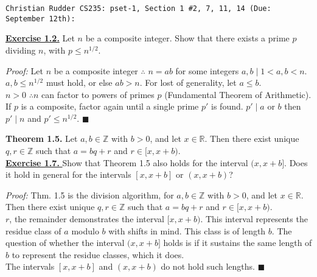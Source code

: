 \documentclass{article}
\begin{document}
\noindent
\textcolor{black!50}{\texttt{Christian Rudder CS235: pset-1, Section 1 \#2, 7, 11, 14 (Due: September 12th):}}

\vspace{2em}
\noindent
\underline{\textbf{Exercise 1.2.}} Let \( n \) be a composite integer.
Show that there exists a prime \( p \) dividing \( n \), with \( p \leq n^{1/2} \).

\begin{greenbox}
    \textit{Proof:} Let $n$ be a composite integer $\therefore$ $n = ab$ for some integers $a, b\mid 1 < a, b < n$.\\
    $a,b \leq n^{1/2}$ must hold, or else $ab > n$. For lost of generality, let $a \leq b$.\\

    \noindent
    $n>0$ $\therefore n$ can factor to powers of primes $p$ (Fundamental Theorem of Arithmetic).
    If $p$ is a composite, factor again until a single prime $p'$ is found. $p'\mid a$ or $b$ then $p' \mid n$ and $p' \leq n^{1/2}$. \hfill \(\blacksquare\)
\end{greenbox}

\noindent
\textbf{Theorem 1.5.} Let \( a, b \in \mathbb{Z} \) with \( b > 0 \), and let \( x \in \mathbb{R} \). Then there exist unique \( q, r \in \mathbb{Z} \) such that \( a = bq + r \) and \( r \in [x, x + b) \).\\

    \noindent
    \underline{\textbf{Exercise 1.7.} }Show that Theorem 1.5 also holds for the interval \( (x, x + b] \). Does it hold in general for the intervals \([x, x + b]\) or \( (x, x + b) \)?
\begin{greenbox}
    \textit{Proof:} Thm. 1.5 is the division algorithm, for \( a, b \in \mathbb{Z} \) with \( b > 0 \), and let \( x \in \mathbb{R} \). Then there exist unique \( q, r \in \mathbb{Z} \) such that \( a = bq + r \) and \( r \in [x, x + b) \).\\

    \noindent
    $r$, the remainder demonstrates the interval \([x, x + b)\).
            This interval represents the residue class of $a$ modulo $b$ with shifts in mind. This class is of length $b$.
            The question of whether the interval \((x, x + b]\) holds is if it sustains the same length of $b$ to represent the residue classes, which it does.\\

    \noindent
    The intervals \([x, x + b]\) and \((x, x + b)\) do not hold such lengths. \hfill \(\blacksquare\)
\end{greenbox}
\end{document}
